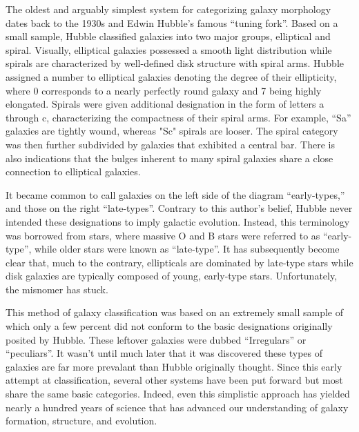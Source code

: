 The oldest and arguably simplest system for categorizing galaxy morphology dates back to the 1930s and Edwin Hubble's famous ``tuning fork''. Based on a small sample, Hubble classified galaxies into two major groups, elliptical and spiral. Visually, elliptical galaxies possessed a smooth light distribution while spirals are characterized by well-defined disk structure with spiral arms. Hubble assigned a number to elliptical galaxies denoting the degree of their ellipticity, where 0 corresponds to a nearly perfectly round galaxy and 7 being highly elongated. Spirals were given additional designation in the form of letters a through c, characterizing the compactness of their spiral arms. For example, ``Sa'' galaxies are tightly wound, whereas "Sc" spirals are looser. The spiral category was then further subdivided by galaxies that exhibited a central bar. There is also indications that the bulges inherent to many spiral galaxies share a close connection to elliptical galaxies. 

It became common to call galaxies on the left side of the diagram ``early-types,'' and those on the right ``late-types''. Contrary to this author's belief, Hubble never intended these designations to imply galactic evolution. Instead, this terminology was borrowed from stars, where massive O and B stars were referred to as ``early-type'', while older stars were known as ``late-type''\citep{Buta2011}. It has subsequently become clear that, much to the contrary, ellipticals are dominated by late-type stars while disk galaxies are typically composed of young, early-type stars.  Unfortunately, the misnomer has stuck. 



This method of galaxy classification was based on an extremely small sample of which only a few percent did not conform to the basic designations originally posited by Hubble. These leftover galaxies were dubbed ``Irregulars'' or ``peculiars''. It wasn't until much later that it was discovered these types of galaxies are far more prevalant than Hubble originally thought. Since this early attempt at classification, several other systems have been put forward but most share the same basic categories. Indeed, even this simplistic approach has yielded nearly a hundred years of science that has advanced our understanding of galaxy formation, structure, and evolution. 
 



